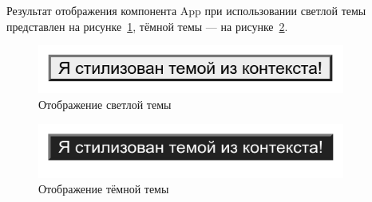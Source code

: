 Результат отображения компонента App при использовании светлой темы представлен на рисунке~\ref{img:react__context-light}, тёмной темы --- на рисунке~\ref{img:react__context-dark}.

\begin{figure}[H]
  \centering
  \includegraphics[width=0.9\textwidth]{assets/images/theoretical2/react_context-light.png}
  \caption{Отображение светлой темы}
  \label{img:react__context-light}
\end{figure}

\begin{figure}[H]
  \centering
  \includegraphics[width=0.9\textwidth]{assets/images/theoretical2/react_context-dark.png}
  \caption{Отображение тёмной темы}
  \label{img:react__context-dark}
\end{figure}